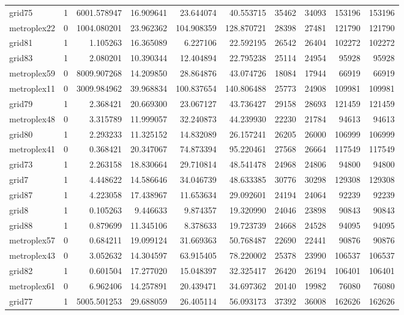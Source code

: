 \begin{longtable}{|l|r|r|r|r|r|r|r|r|r|}
grid75 & 1 & 6001.578947 & 16.909641 & 23.644074 & 40.553715 & 35462 & 34093 & 153196 & 153196 \\
metroplex22 & 0 & 1004.080201 & 23.962362 & 104.908359 & 128.870721 & 28398 & 27481 & 121790 & 121790 \\
grid81 & 1 & 1.105263 & 16.365089 & 6.227106 & 22.592195 & 26542 & 26404 & 102272 & 102272 \\
grid83 & 1 & 2.080201 & 10.390344 & 12.404894 & 22.795238 & 25114 & 24954 & 95928 & 95928 \\
metroplex59 & 0 & 8009.907268 & 14.209850 & 28.864876 & 43.074726 & 18084 & 17944 & 66919 & 66919 \\
metroplex11 & 0 & 3009.984962 & 39.968834 & 100.837654 & 140.806488 & 25773 & 24908 & 109981 & 109981 \\
grid79 & 1 & 2.368421 & 20.669300 & 23.067127 & 43.736427 & 29158 & 28693 & 121459 & 121459 \\
metroplex48 & 0 & 3.315789 & 11.999057 & 32.240873 & 44.239930 & 22230 & 21784 & 94613 & 94613 \\
grid80 & 1 & 2.293233 & 11.325152 & 14.832089 & 26.157241 & 26205 & 26000 & 106999 & 106999 \\
metroplex41 & 0 & 0.368421 & 20.347067 & 74.873394 & 95.220461 & 27568 & 26664 & 117549 & 117549 \\
grid73 & 1 & 2.263158 & 18.830664 & 29.710814 & 48.541478 & 24968 & 24806 & 94800 & 94800 \\
grid7 & 1 & 4.448622 & 14.586646 & 34.046739 & 48.633385 & 30776 & 30298 & 129308 & 129308 \\
grid87 & 1 & 4.223058 & 17.438967 & 11.653634 & 29.092601 & 24194 & 24064 & 92239 & 92239 \\
grid8 & 1 & 0.105263 & 9.446633 & 9.874357 & 19.320990 & 24046 & 23898 & 90843 & 90843 \\
grid88 & 1 & 0.879699 & 11.345106 & 8.378633 & 19.723739 & 24668 & 24528 & 94095 & 94095 \\
metroplex57 & 0 & 0.684211 & 19.099124 & 31.669363 & 50.768487 & 22690 & 22441 & 90876 & 90876 \\
metroplex43 & 0 & 3.052632 & 14.304597 & 63.915405 & 78.220002 & 25378 & 23990 & 106537 & 106537 \\
grid82 & 1 & 0.601504 & 17.277020 & 15.048397 & 32.325417 & 26420 & 26194 & 106401 & 106401 \\
metroplex61 & 0 & 6.962406 & 14.257891 & 20.439471 & 34.697362 & 20140 & 19982 & 76080 & 76080 \\
grid77 & 1 & 5005.501253 & 29.688059 & 26.405114 & 56.093173 & 37392 & 36008 & 162626 & 162626 \\

\end{longtable}
